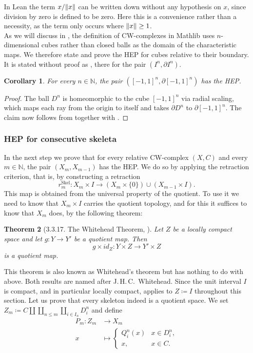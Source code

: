 \documentclass[11pt, a4paper, english]{article}
\DeclarePairedDelimiter\norm{\lVert}{\rVert}
\theoremstyle{plain}
\newtheorem{theorem}{Theorem}
\newtheorem{corollary}[theorem]{Corollary}
\theoremstyle{definition}
\theoremstyle{remark}
\numberwithin{equation}{section}
\numberwithin{theorem}{section}
\begin{document}
In Lean the term $x / \norm{x}$ can be written down without any hypothesis on $x$, since division by zero is defined to be zero. Here this is a convenience rather than a necessity, as the term only occurs where $\norm{x} \ge 1$. \\
As we will discuss in , the definition of CW-complexes in Mathlib uses $n$-dimensional cubes rather than closed balls as the domain of the characteristic maps. We therefore state and prove the HEP for cubes relative to their boundary. It is stated without proof as \cite[Example 5.1.4]{Tammo}, there for the pair $(I^n, \partial I^n)$. 

\begin{corollary} \label{cor:HEPcube}
    For every $ n \in \mathbb{N}$, the pair $([ - 1 ,1 ]^n , \partial [- 1 ,1 ]^n ) $ has the HEP. 
\end{corollary}
\begin{proof}
    The ball $D^n$ is homeomorphic to the cube $[-1,1]^n$ via radial scaling, which maps each ray from the origin to itself and takes $\partial D^n$ to $\partial [-1,1]^n$. The claim now follows from  together with .
\end{proof}

\subsubsection{HEP for consecutive skeleta} \label{subsubsec:HEP_skel}
In the next step we prove that for every relative CW-complex $(X,C)$ and every $m \in \mathbb{N}$, the pair $(X_m,X_{m-1})$ has the HEP. We do so by applying the retraction criterion, that is, by constructing a retraction 
\[ r^{\mathrm{Skel}}_m \colon X_m \times I \to (X_m \times \{0\}) \cup (X_{m-1} \times I). \] 
This map is obtained from the universal property of the quotient. To use it we need to know that $X_m \times I$ carries the quotient topology, and for this it suffices to know that $X_m$ does, by the following theorem: 

\begin{theorem} [3.3.17. The Whitehead Theorem, \cite{RYS}] \label{thm:quotientproduct}
    Let $Z$ be a locally compact space and let $g \colon Y \to Y'$ be a quotient map. Then
    \[
        g \times id_Z \colon Y \times Z \to Y' \times Z
    \]
    is a quotient map.
\end{theorem}
This theorem is also known as Whitehead's theorem but has nothing to do with  above. Both results are named after J.\,H.\,C.\ Whitehead. Since the unit interval $I$ is compact, and in particular locally compact,  applies to $Z \coloneqq I$ throughout this section. Let us prove that every skeleton indeed is a quotient space. We set $ Z_m \coloneqq C \amalg \coprod_{n \le m} \coprod_{i\in I_n}  D_i^n $ and define  
\begin{align*} 
        P_m : Z_m &\to X_m \\
        x &\mapsto \begin{cases}
        Q_i^n (x) & x \in  D_i^n, \\
        x, &  x \in C.
        \end{cases}
\end{align*}
\end{document}
